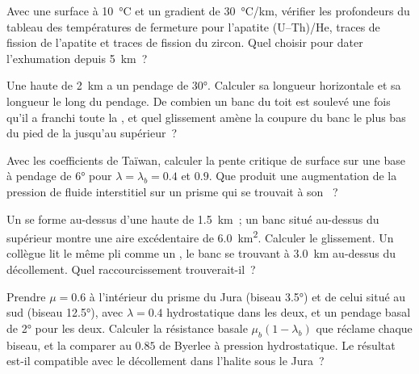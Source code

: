 \begin{exercise}[$\star$]\label{exo:b3:orogenic-wedges:3}
Avec une surface à \qty{10}{\celsius} et un gradient de \qty{30}{\celsius/km},
vérifier les profondeurs du tableau des températures de fermeture pour l'apatite
(U--Th)/He, traces de fission de l'apatite et traces de fission du zircon. Quel
 choisir pour dater l'exhumation depuis \qty{5}{km}~?
\end{exercise}

\begin{exercise}[$\star$]\label{exo:b3:orogenic-wedges:4}
Une  haute de \qty{2}{km} a un pendage de \ang{30}. Calculer sa longueur horizontale et sa
longueur le long du pendage. De combien un banc du toit est soulevé une fois
qu'il a franchi toute la , et quel glissement amène la coupure du banc le plus bas
du pied de la  jusqu'au  supérieur~?
\end{exercise}

\begin{exercise}[$\star\star$]\label{exo:b3:orogenic-wedges:5}
Avec les coefficients de Taïwan, calculer la pente critique de surface sur une base
à pendage de \ang{6} pour $\lambda = \lambda_b = 0.4$ et $0.9$. Que produit une
augmentation de la pression de fluide interstitiel sur un prisme qui se trouvait à son ~?
\end{exercise}

\begin{exercise}[$\star\star$]\label{exo:b3:orogenic-wedges:6}
Un  se forme au-dessus d'une  haute de \qty{1.5}{km}~; un banc situé au-dessus du
 supérieur montre une aire excédentaire de \qty{6.0}{km^2}. Calculer le glissement. Un collègue
lit le même pli comme un , le banc se trouvant à \qty{3.0}{km} au-dessus
du décollement. Quel raccourcissement trouverait-il~?
\end{exercise}

\begin{exercise}[$\star\star$]\label{exo:b3:orogenic-wedges:7}
Prendre $\mu = 0.6$ à l'intérieur du prisme du Jura (biseau \ang{3.5}) et de celui situé au
sud (biseau \ang{12.5}), avec $\lambda = 0.4$ hydrostatique dans les deux, et
un pendage basal de \ang{2} pour les deux. Calculer la résistance basale $\mu_b(1 -
\lambda_b)$ que réclame chaque biseau, et la comparer au $0.85$ de Byerlee
à pression hydrostatique. Le résultat est-il compatible avec le décollement dans
l'halite sous le Jura~?
\end{exercise}

